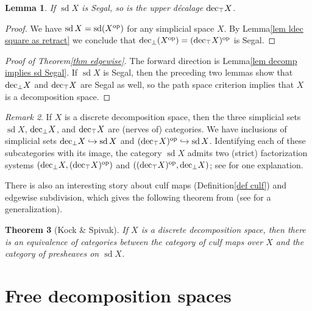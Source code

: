\documentclass{conm-p-l}
\newtheorem{theorem}{Theorem}[section]
\newtheorem{lemma}[theorem]{Lemma}
\theoremstyle{definition}
\theoremstyle{remark}
\newtheorem{remark}[theorem]{Remark}
\newcommand{\op}{\textup{op}}
\newcommand{\udec}{\textup{dec}_{\top}}
\newcommand{\ldec}{\textup{dec}_{\perp}}
\DeclareMathOperator{\sd}{sd}
\begin{document}
\begin{lemma}
If $\sd X$ is Segal, so is the upper d\'ecalage $\udec X$.
\end{lemma}
\begin{proof}
We have $\sd X = \sd (X^\op)$ for any simplicial space $X$. 
By Lemma\nobreakspace \ref {lem ldec square as retract} we conclude that $\ldec(X^\op) = (\udec X)^\op$ is Segal.
\end{proof}

\begin{proof}[Proof of Theorem\nobreakspace \ref {thm edgewise}]
The forward direction is Lemma\nobreakspace \ref {lem decomp implies sd Segal}.
If $\sd X$ is Segal, then the preceding two lemmas show that $\ldec X$ and $\udec X$ are Segal as well, so the path space criterion implies that $X$ is a decomposition space.
\end{proof}


\begin{remark}\label{rmk sd vs dec}
If $X$ is a discrete decomposition space, then the three simplicial sets $\sd X$, $\ldec X$, and $\udec X$ are (nerves of) categories.
We have inclusions of simplicial sets $\ldec X \hookrightarrow \sd X$ and $(\udec X)^\op \hookrightarrow \sd X$.
Identifying each of these subcategories with its image, the category $\sd X$ admits two (strict) factorization systems $(\ldec X, (\udec X)^\op)$ and $((\udec X)^\op, \ldec X)$; see \cite{Hackney:OC2SS} for one explanation.%
\end{remark}

There is also an interesting story about culf maps (Definition\nobreakspace \ref {def culf}) and edgewise subdivision, which gives the following theorem from \cite{KockSpivak:DSST} (see \cite{HackneyKock:CMES} for a generalization). 

\begin{theorem}[Kock \& Spivak]\label{thm kock spivak}
If $X$ is a discrete decomposition space, then there is an equivalence of categories between the category of culf maps over $X$ and the category of presheaves on $\sd X$.
\end{theorem}

\section{Free decomposition spaces}\label{sec free}
\end{document}
